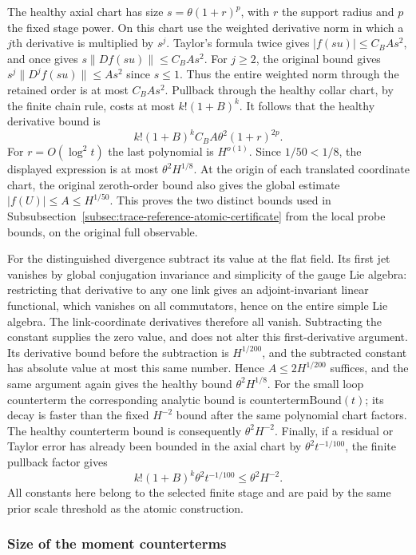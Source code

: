 The healthy axial chart has size
$s=\theta(1+r)^p$, with $r$ the support radius and $p$ the fixed stage
power. On this chart use the weighted derivative norm in which a
$j$th derivative is multiplied by $s^j$. Taylor's formula twice gives
$|f(su)|\le C_B A s^2$, and once gives
$s\|Df(su)\|\le C_B A s^2$. For $j\ge2$, the original bound gives
$s^j\|D^jf(su)\|\le A s^2$ since $s\le1$. Thus the entire weighted
norm through the retained order is at most $C_B A s^2$. Pullback through
the healthy collar chart, by the finite chain rule, costs at most
$k!(1+B)^k$. It follows that the healthy derivative bound is
\[
 k!(1+B)^k C_B A\theta^2(1+r)^{2p}.
\]
For $r=O(\log^2t)$ the last polynomial is $H^{o(1)}$. Since
$1/50<1/8$, the displayed expression is at most
$\theta^2H^{1/8}$. At the origin of each translated coordinate chart,
the original zeroth-order bound also gives the global estimate
$|f(U)|\le A\le H^{1/50}$. This proves the two distinct bounds used in
Subsubsection~\ref{subsec:trace-reference-atomic-certificate} from the local
probe bounds, on the original full observable.

For the distinguished divergence subtract its value at the flat field.
Its first jet vanishes by global conjugation invariance and simplicity
of the gauge Lie algebra: restricting that derivative to any one link
gives an adjoint-invariant linear functional, which vanishes on all
commutators, hence on the entire simple Lie algebra. The link-coordinate
derivatives therefore all vanish. Subtracting the constant supplies the
zero value, and does not alter this first-derivative argument.
Its derivative bound before the subtraction is $H^{1/200}$, and the
subtracted constant has absolute value at most this same number. Hence
$A\le2H^{1/200}$ suffices, and the same argument again gives the healthy
bound $\theta^2H^{1/8}$. For the small loop counterterm the corresponding
analytic bound is $\mathrm{countertermBound}(t)$; its decay is faster than the
fixed $H^{-2}$ bound after the same polynomial chart factors. The
healthy counterterm bound is consequently $\theta^2H^{-2}$. Finally,
if a residual or Taylor error has already been bounded in the axial
chart by $\theta^2t^{-1/100}$, the finite pullback factor gives
\[
 k!(1+B)^k\theta^2t^{-1/100}\le\theta^2H^{-2}.
\]
All constants here belong to the selected finite stage and are paid by
the same prior scale threshold as the atomic construction.

\subsubsection{Size of the moment counterterms}
\label{subsec:trace-charge-counterterm-size}

